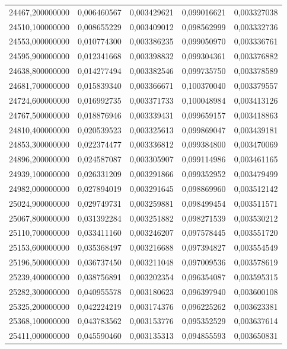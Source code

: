 \begin{longtable}{rrrrr}
24467,200000000 & 0,006460567 & 0,003429621 & 0,099016621 & 0,003327038\\
24510,100000000 & 0,008655229 & 0,003409012 & 0,098562999 & 0,003332736\\
24553,000000000 & 0,010774300 & 0,003386235 & 0,099050970 & 0,003336761\\
24595,900000000 & 0,012341668 & 0,003398832 & 0,099304361 & 0,003376882\\
24638,800000000 & 0,014277494 & 0,003382546 & 0,099735750 & 0,003378589\\
24681,700000000 & 0,015839340 & 0,003366671 & 0,100370040 & 0,003379557\\
24724,600000000 & 0,016992735 & 0,003371733 & 0,100048984 & 0,003413126\\
24767,500000000 & 0,018876946 & 0,003339431 & 0,099659157 & 0,003418863\\
24810,400000000 & 0,020539523 & 0,003325613 & 0,099869047 & 0,003439181\\
24853,300000000 & 0,022374477 & 0,003336812 & 0,099384800 & 0,003470069\\
24896,200000000 & 0,024587087 & 0,003305907 & 0,099114986 & 0,003461165\\
24939,100000000 & 0,026331209 & 0,003291866 & 0,099352952 & 0,003479499\\
24982,000000000 & 0,027894019 & 0,003291645 & 0,098869960 & 0,003512142\\
25024,900000000 & 0,029749731 & 0,003259881 & 0,098499454 & 0,003511571\\
25067,800000000 & 0,031392284 & 0,003251882 & 0,098271539 & 0,003530212\\
25110,700000000 & 0,033411160 & 0,003246207 & 0,097578445 & 0,003551720\\
25153,600000000 & 0,035368497 & 0,003216688 & 0,097394827 & 0,003554549\\
25196,500000000 & 0,036737450 & 0,003211048 & 0,097009536 & 0,003578619\\
25239,400000000 & 0,038756891 & 0,003202354 & 0,096354087 & 0,003595315\\
25282,300000000 & 0,040955578 & 0,003180623 & 0,096397940 & 0,003600108\\
25325,200000000 & 0,042224219 & 0,003174376 & 0,096225262 & 0,003623381\\
25368,100000000 & 0,043783562 & 0,003153776 & 0,095352529 & 0,003637614\\
25411,000000000 & 0,045590460 & 0,003135313 & 0,094855593 & 0,003650831\\

\end{longtable}
